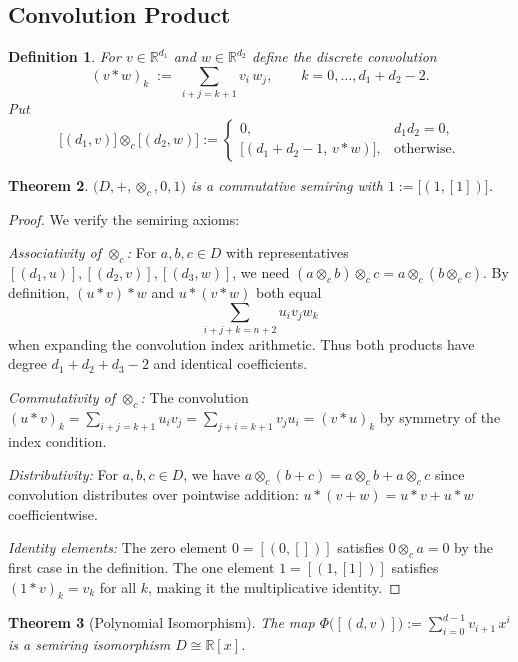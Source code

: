 \documentclass[11pt]{article}
\newtheorem{theorem}{Theorem}[section]
\newtheorem{definition}[theorem]{Definition}
\begin{document}
\subsection{Convolution Product}
\begin{definition}
For \(v\in\mathbb R^{d_1}\) and \(w\in\mathbb R^{d_2}\) define the discrete convolution
\[
  (v\ast w)_k \;:=\;\sum_{i+j=k+1} v_i\,w_j,\qquad k=0,\dots,d_1+d_2-2.
\]
Put
\[
  \bigl[(d_1,v)\bigr]\otimes_c\bigl[(d_2,w)\bigr]
  :=\begin{cases}
       0, & d_1d_2=0,\\[2pt]
       \bigl[(d_1+d_2-1,\,v\ast w)\bigr], & \text{otherwise.}
     \end{cases}
\]
\end{definition}

\begin{theorem}\label{thm:convSemiring}
\(\bigl(D,+,\otimes_c,0,1\bigr)\) is a commutative semiring with \(1:=\bigl[(1,[1])\bigr]\).
\end{theorem}
\begin{proof}
We verify the semiring axioms:

\textit{Associativity of $\otimes_c$:} For $a, b, c \in D$ with representatives $[(d_1,u)], [(d_2,v)], [(d_3,w)]$, we need $(a \otimes_c b) \otimes_c c = a \otimes_c (b \otimes_c c)$. By definition, $(u \ast v) \ast w$ and $u \ast (v \ast w)$ both equal
\[
\sum_{i+j+k=n+2} u_i v_j w_k
\]
when expanding the convolution index arithmetic. Thus both products have degree $d_1 + d_2 + d_3 - 2$ and identical coefficients.

\textit{Commutativity of $\otimes_c$:} The convolution $(u \ast v)_k = \sum_{i+j=k+1} u_i v_j = \sum_{j+i=k+1} v_j u_i = (v \ast u)_k$ by symmetry of the index condition.

\textit{Distributivity:} For $a, b, c \in D$, we have $a \otimes_c (b + c) = a \otimes_c b + a \otimes_c c$ since convolution distributes over pointwise addition: $u \ast (v + w) = u \ast v + u \ast w$ coefficientwise.

\textit{Identity elements:} The zero element $0 = [(0,[])]$ satisfies $0 \otimes_c a = 0$ by the first case in the definition. The one element $1 = [(1,[1])]$ satisfies $(1 \ast v)_k = v_k$ for all $k$, making it the multiplicative identity.
\qedhere
\end{proof}

\begin{theorem}[Polynomial Isomorphism]\label{thm:polyIso}
The map
\(\Phi\bigl([(d,v)]\bigr):=\sum_{i=0}^{d-1} v_{i+1}\,x^{i}\) is a semiring isomorphism \(D\cong\mathbb R[x]\).
\end{theorem}
\end{document}
